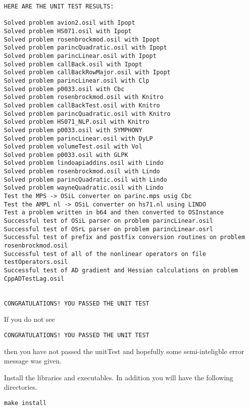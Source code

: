 \documentclass[11pt]{article}
\renewcommand{\_}{{\char"5F}}
\renewcommand{\{}{{\char"7B}}
\renewcommand{\}}{{\char"7D}}
\renewcommand{\^}{{\char"0D}}
\renewcommand{\'}{{\char"0D}}
\begin{document}
{\small
\begin{verbatim}
HERE ARE THE UNIT TEST RESULTS:

Solved problem avion2.osil with Ipopt
Solved problem HS071.osil with Ipopt
Solved problem rosenbrockmod.osil with Ipopt
Solved problem parincQuadratic.osil with Ipopt
Solved problem parincLinear.osil with Ipopt
Solved problem callBack.osil with Ipopt
Solved problem callBackRowMajor.osil with Ipopt
Solved problem parincLinear.osil with Clp
Solved problem p0033.osil with Cbc
Solved problem rosenbrockmod.osil with Knitro
Solved problem callBackTest.osil with Knitro
Solved problem parincQuadratic.osil with Knitro
Solved problem HS071_NLP.osil with Knitro
Solved problem p0033.osil with SYMPHONY
Solved problem parincLinear.osil with DyLP
Solved problem volumeTest.osil with Vol
Solved problem p0033.osil with GLPK
Solved problem lindoapiaddins.osil with Lindo
Solved problem rosenbrockmod.osil with Lindo
Solved problem parincQuadratic.osil with Lindo
Solved problem wayneQuadratic.osil with Lindo
Test the MPS -> OSiL converter on parinc.mps usig Cbc
Test the AMPL nl -> OSiL converter on hs71.nl using LINDO
Test a problem written in b64 and then converted to OSInstance
Successful test of OSiL parser on problem parincLinear.osil
Successful test of OSrL parser on problem parincLinear.osrl
Successful test of prefix and postfix conversion routines on problem rosenbrockmod.osil
Successful test of all of the nonlinear operators on file testOperators.osil
Successful test of AD gradient and Hessian calculations on problem CppADTestLag.osil


CONGRATULATIONS! YOU PASSED THE UNIT TEST
\end{verbatim}
}

If you do not see
\begin{verbatim}
CONGRATULATIONS! YOU PASSED THE UNIT TEST
\end{verbatim}
then you have not passed the unitTest and hopefully some semi-inteligble error message was given.

\vskip 8pt

  Install the libraries and executables.  In addition you will have the following directories.

\begin{verbatim}
make install
\end{verbatim}
\end{document}
